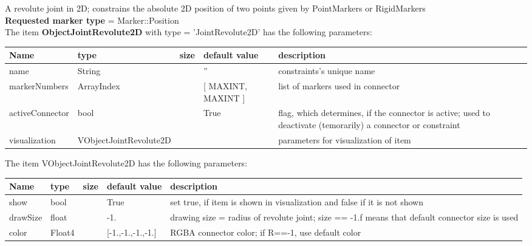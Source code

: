 A revolute joint in 2D; constrains the absolute 2D position of two points given by PointMarkers or RigidMarkers
 \\  {\bf Requested marker type} = Marker::Position \\ 
\vspace{12pt} \noindent The item {\bf ObjectJointRevolute2D} with type = 'JointRevolute2D' has the following parameters:\vspace{-1cm}\\ 
\begin{center}
  \footnotesize
  \begin{longtable}{| p{4.5cm} | p{2.5cm} | p{0.5cm} | p{2.5cm} | p{6cm} |}
    \hline
    \bf Name & \bf type & \bf size & \bf default value & \bf description \\ \hline
    name &     String &      &     '' &     constraints's unique name\\ \hline
    markerNumbers &     ArrayIndex &      &     [ MAXINT, MAXINT ] &     list of markers used in connector\\ \hline
    activeConnector &     bool &      &     True &     flag, which determines, if the connector is active; used to deactivate (temorarily) a connector or constraint\\ \hline
    visualization & VObjectJointRevolute2D & & & parameters for visualization of item \\ \hline
	  \end{longtable}
	\end{center}
The item VObjectJointRevolute2D has the following parameters:\vspace{-1cm}\\ 
\begin{center}
  \footnotesize
  \begin{longtable}{| p{4.5cm} | p{2.5cm} | p{0.5cm} | p{2.5cm} | p{6cm} |}
    \hline
    \bf Name & \bf type & \bf size & \bf default value & \bf description \\ \hline
    show &     bool &      &     True &     set true, if item is shown in visualization and false if it is not shown\\ \hline
    drawSize &     float &      &     -1. &     drawing size = radius of revolute joint; size == -1.f means that default connector size is used\\ \hline
    color &     Float4 &      &     [-1.,-1.,-1.,-1.] &     RGBA connector color; if R==-1, use default color\\ \hline
	  \end{longtable}
	\end{center}

